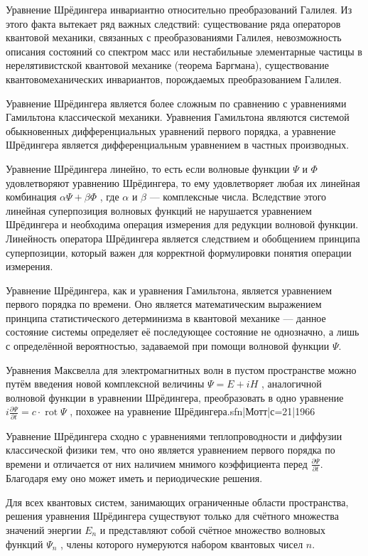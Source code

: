 \documentclass[a4paper,14pt,russian]{article}
\begin{document}
Уравнение Шрёдингера инвариантно относительно преобразований Галилея. Из этого факта вытекает ряд важных следствий: существование ряда операторов квантовой механики, связанных с преобразованиями Галилея, невозможность описания состояний со спектром масс или нестабильные элементарные частицы в нерелятивистской квантовой механике (теорема Баргмана), существование квантовомеханических инвариантов, порождаемых преобразованием Галилея.

Уравнение Шрёдингера является более сложным по сравнению с уравнениями Гамильтона классической механики. Уравнения Гамильтона являются системой обыкновенных дифференциальных уравнений первого порядка, а уравнение Шрёдингера является дифференциальным уравнением в частных производных.

Уравнение Шрёдингера линейно, то есть если волновые функции 
$
\Psi
$
и 
$
\Phi
$
удовлетворяют уравнению Шрёдингера, то ему удовлетворяет любая их линейная комбинация 
$
\alpha \Psi + \beta \Phi
$
, где 
$
\alpha
$
и 
$
\beta
$ — комплексные числа. Вследствие этого линейная суперпозиция волновых функций не нарушается уравнением Шрёдингера и необходима операция измерения для редукции волновой функции. Линейность оператора Шрёдингера является следствием и обобщением принципа суперпозиции, который важен для корректной формулировки понятия операции измерения.

Уравнение Шрёдингера, как и уравнения Гамильтона, является уравнением первого порядка по времени. Оно является математическим выражением принципа статистического детерминизма в квантовой механике — данное состояние системы определяет её последующее состояние не однозначно, а лишь с определённой вероятностью, задаваемой при помощи волновой функции 
$
\Psi
$.

Уравнения Максвелла для электромагнитных волн в пустом пространстве можно путём введения новой комплексной величины 
$
\Psi = E + iH
$
, аналогичной волновой функции в уравнении Шрёдингера, преобразовать в одно уравнение 
$
i \frac{\partial  \Psi}{\partial t} = c \cdot \operatorname{rot} \Psi
$
, похожее на уравнение Шрёдингера.{{sfn|Мотт|с=21|1966}}

Уравнение Шрёдингера сходно с уравнениями теплопроводности и диффузии классической физики тем, что оно является уравнением первого порядка по времени и отличается от них наличием мнимого коэффициента перед 
$
\frac{\partial \Psi}{\partial t}
$. Благодаря ему оно может иметь и периодические решения.

Для всех квантовых систем, занимающих ограниченные области пространства, решения уравнения Шрёдингера существуют только для счётного множества значений энергии 
$
E_{n}
$
и представляют собой счётное множество волновых функций 
$
\Psi_{n}
$
, члены которого нумеруются набором квантовых чисел 
$
n
$.
\end{document}
